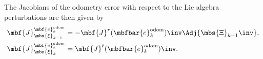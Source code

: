 \documentclass[ nobib, nofonts, notoc]{tufte-handout}
\begin{document}
    The Jacobians of the odometry error with respect to the Lie algebra perturbations are then given by
    \begin{align}
        \mbf{J}
            ^{\mbf{e}
                ^{\mathrm{odom}}
                _{k}}
            _{\mbs{\xi}_{k-1}} 
        &= 
        -\mbf{J}^{r}(\mbfbar{e}^{\mathrm{odom}}_{k})\inv
        \Adj{\mbs{\Xi}_{k-1}\inv}
        , \\
        \mbf{J}
            ^{\mbf{e}
                ^{\mathrm{odom}}
                _{k}}
            _{\mbs{\xi}_{k}} 
        &= 
        \mbf{J}^{\ell}(\mbfbar{e}^{\mathrm{odom}}_{k})\inv.        
    \end{align}
    

    \clearpage
    
    
\end{document}
